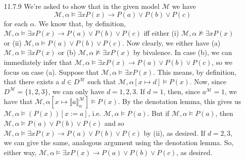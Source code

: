 \begin{itemize}
                        \item[11.7.9] We're asked to show that in the
                          given model $\mathcal{M}$ we have
                          \[\mathcal{M},\alpha\vDash \exists xP(x)\to
                          P(a)\lor P(b)\lor P(c)\] for each
                          $\alpha$. We know that, by definition, $\mathcal{M},\alpha\vDash \exists xP(x)\to
                          P(a)\lor P(b)\lor P(c)$ iff either (i)
                          $\mathcal{M},\alpha\nvDash \exists xP(x)$ or (ii)
                          $\mathcal{M},\alpha\vDash
                          P(a)\lor P(b)\lor P(c)$. Now clearly, we
                          either have (a) $\mathcal{M},\alpha\vDash
                          \exists xP(x)$ or (b)
                          $\mathcal{M},\alpha\nvDash \exists xP(x)$ by
                          bivalence. In case (b), we can immediately
                          infer that $\mathcal{M},\alpha\vDash \exists xP(x)\to
                          P(a)\lor P(b)\lor P(c)$, so we focus on case
                          (a). Suppose that $\mathcal{M},\alpha\vDash
                          \exists xP(x)$. This means, by definition,
                          that there exists a $d\in D^\mathcal{M}$
                          such that $\mathcal{M},\alpha[x\mapsto d]\vDash
                           P(x)$. Now, since
                           $D^\mathcal{M}=\{1,2,3\}$, we can only have
                           $d=1,2,3$. If $d=1$, then, since
                           $a^\mathcal{M}=1$, we have that
                           $\mathcal{M},\alpha[x\mapsto \llbracket
                           a\rrbracket^\mathcal{M}_\alpha]\vDash 
                           P(x)$. By the denotation lemma, this gives
                           us $\mathcal{M},\alpha\vDash 
                           (P(x))[x:=a]$, i.e. $\mathcal{M},\alpha\vDash 
                           P(a)$. But if $\mathcal{M},\alpha\vDash 
                           P(a)$, then $\mathcal{M},\alpha\vDash 
                           P(a)\lor P(b)\lor P(c)$ and so $\mathcal{M},\alpha\vDash \exists xP(x)\to
                          P(a)\lor P(b)\lor P(c)$ by (ii), as
                          desired. If $d=2,3$, we can give the same,
                          analogous argument using the denotation
                          lemma. So, either way,  $\mathcal{M},\alpha\vDash \exists xP(x)\to
                          P(a)\lor P(b)\lor P(c)$, as desired.


\end{itemize}
